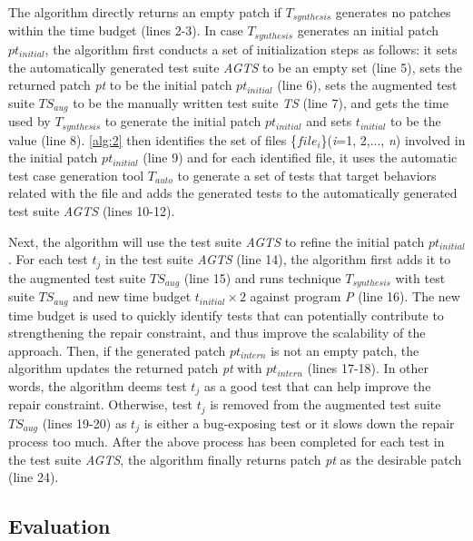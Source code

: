 The algorithm directly returns an empty patch if $T_{synthesis}$ generates no patches within the time budget (lines 2-3).
In case $T_{synthesis}$ generates an initial patch $pt_{initial}$, the algorithm first conducts a set of initialization steps as follows: 
it sets the automatically generated test suite \emph{AGTS} to be an empty set (line 5), sets the returned patch \emph{pt} to be the initial patch $pt_{initial}$ (line 6), sets the augmented test suite $TS_{aug}$ to be the manually written test suite \emph{TS} (line 7), and gets the time used by $T_{synthesis}$ to generate the initial patch $pt_{initial}$ and sets $t_{initial}$ to be the value (line 8).
\autoref{alg:2} then identifies the set of files \{$file_i$\}(\emph{i}=1, 2,..., \emph{n}) involved in the initial patch $pt_{initial}$ (line 9) and for each identified file, it uses the automatic test case generation tool $T_{auto}$ to generate a set of tests that target behaviors related with the file and adds the generated tests to the automatically generated test suite \emph{AGTS} (lines 10-12). 

Next, the algorithm will use the test suite \emph{AGTS} to refine the initial patch $pt_{initial}$. 
For each test $t_j$ in the test suite \emph{AGTS} (line 14), the algorithm first adds it to the augmented test suite $TS_{aug}$ (line 15) and runs technique $T_{synthesis}$ with test suite $TS_{aug}$ and new time budget $t_{initial} \times 2$ against program \emph{P} (line 16).
The new time budget is used to quickly identify tests that can potentially contribute to strengthening the repair constraint, and thus improve the scalability of the approach. 
Then, if the generated patch $pt_{intern}$ is not an empty patch, the algorithm updates the returned patch \emph{pt} with $pt_{intern}$ (lines 17-18). 
In other words, the algorithm deems test $t_j$ as a good test that can help improve the repair constraint. 
Otherwise, test $t_j$ is removed from the augmented test suite $TS_{aug}$ (lines 19-20) as $t_j$ is either a bug-exposing test or it slows down the repair process too much. 
After the above process has been completed for each test in the test suite \emph{AGTS}, the algorithm finally returns patch \emph{pt} as the desirable patch (line 24). 

\subsection{Evaluation}
\label{subsec:transversal-contributions:test-for-repair:evaluations}

